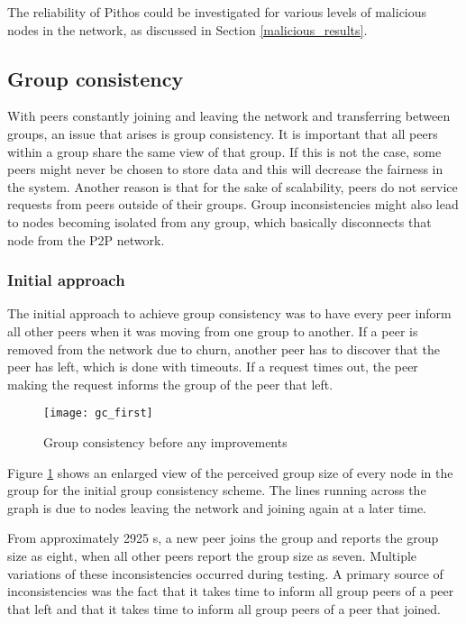 The reliability of Pithos could be investigated for various levels of malicious nodes in the network, as discussed in Section \ref{malicious_results}.

\subsection{Group consistency}
\label{group_consistency_implementation}

With peers constantly joining and leaving the network and transferring between groups, an issue that arises is group consistency. It is important that all peers within a group share the same view of that group. If this is not the case, some peers might never be chosen to store data and this will decrease the fairness in the system. Another reason is that for the sake of scalability, peers do not service requests from peers outside of their groups. Group inconsistencies might also lead to nodes becoming isolated from any group, which basically disconnects that node from the P2P network.

\subsubsection{Initial approach}
The initial approach to achieve group consistency was to have every peer inform all other peers when it was moving from one group to another. If a peer is removed from the network due to churn, another peer has to discover that the peer has left, which is done with timeouts. If a request times out, the peer making the request informs the group of the peer that left.

\begin{figure}[htbp]
 \centering
 \texttt{[image: gc\_first]}
 \caption{Group consistency before any improvements}
 \label{fig_gc_first}
\end{figure}
%
Figure \ref{fig_gc_first} shows an enlarged view of the perceived group size of every node in the group for the initial group consistency scheme. The lines running across the graph is due to nodes leaving the network and joining again at a later time.

From approximately 2925 s, a new peer joins the group and reports the group size as eight, when all other peers report the group size as seven. Multiple variations of these inconsistencies occurred during testing. A primary source of inconsistencies was the fact that it takes time to inform all group peers of a peer that left and that it takes time to inform all group peers of a peer that joined.

